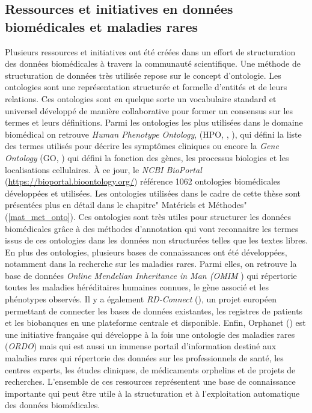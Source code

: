 \subsection{Ressources et initiatives en données biomédicales et maladies rares}\label{onto_ref}
Plusieurs ressources et initiatives ont été créées dans un effort de structuration des données biomédicales à travers la communauté scientifique. Une méthode de structuration de données très utilisée repose sur le concept d'ontologie. Les ontologies sont une représentation structurée et formelle d'entités et de leurs relations. Ces ontologies sont en quelque sorte un vocabulaire standard et universel développé de manière collaborative pour former un consensus sur les termes et leurs définitions. Parmi les ontologies les plus utilisées dans le domaine biomédical on retrouve \textit{Human Phenotype Ontology}, (HPO, \cite{robinson_human_2008}, \cite{kohler_human_2021}), qui défini la liste des termes utilisés pour décrire les symptômes cliniques ou encore la \textit{Gene Ontology }(GO, \cite{the_gene_ontology_consortium_gene_2023}) qui défini la fonction des gènes, les processus biologies et les localisations cellulaires. À ce jour, le \textit{NCBI BioPortal} (\url{https://bioportal.bioontology.org/}) référence 1062 ontologies biomédicales développées et utilisées. Les ontologies utilisées dans le cadre de cette thèse sont présentées plus en détail dans le chapitre" Matériels et Méthodes" (\ref{mat_met_onto}). Ces ontologies sont très utiles pour structurer les données biomédicales grâce à des méthodes d'annotation qui vont reconnaitre les termes issus de ces ontologies dans les données non structurées telles que les textes libres. \\

En plus des ontologies, plusieurs bases de connaissances ont été développées, notamment dans la recherche sur les maladies rares. Parmi elles, on retrouve la base de données \textit{Online Mendelian Inheritance in Man (OMIM} \cite{amberger_omimorg_2015}) qui répertorie toutes les maladies héréditaires humaines connues, le gène associé et les phénotypes observés. Il y a également \textit{RD-Connect} (\cite{laurie_rd-connect_2022}), un projet européen permettant de connecter les bases de données existantes, les registres de patients et les biobanques en une plateforme centrale et disponible. Enfin, Orphanet (\cite{maiella_orphanet_2013}) est une initiative française qui développe à la fois une ontologie des maladies rares (\textit{ORDO}) mais qui est aussi un immense portail d'information destiné aux maladies rares qui répertorie des données sur les professionnels de santé, les centres experts, les études cliniques, de médicaments orphelins et de projets de recherches. L'ensemble de ces ressources représentent une base de connaissance importante qui peut être utile à la structuration et à l'exploitation automatique des données biomédicales. 


